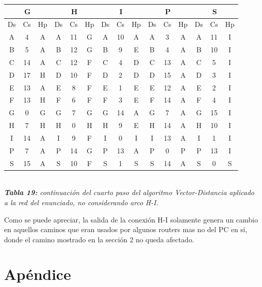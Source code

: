 \documentclass[letterpaper,10pt,onecolumn,titlepage]{article}
\begin{document}
  \begin{center}
   \begin{tabular}{|c|c|c|c|c|c|c|c|c|c|c|c|c|c|c|} \hline
     \multicolumn{3}{|c|}{G} & \multicolumn{3}{|c|}{H} &\multicolumn{3}{|c|}{I} & \multicolumn{3}{|c|}{P} & \multicolumn{3}{|c|}{S}    \\ \hline
     Ds & Cs & Hp & Ds & Cs & Hp & Ds & Cs & Hp & Ds & Cs & Hp & Ds & Cs & Hp  \\ \hline
     A  & 4  & A  & A  & 11  & G  & A  & 10  & A  & A  & 3  & A  & A  & 11  & I   \\ \hline
     B  & 5  & A  & B  & 12  & G  & B  & 9  & E  & B  & 4  & A  & B  & 10  & I   \\ \hline
     C  & 14  & A  & C  & 12  & F  & C  & 4  & D  & C  & 13  & A  & C  & 5  & I \\ \hline
     D  & 17  & H  & D  & 10  & F  & D  & 2  & D  & D  & 15  & A  & D  & 3  & I   \\ \hline
     E  & 13  & A  & E  & 8  & F  & E  & 1  & E  & E  & 12  & A  & E  & 2  & I   \\ \hline
     F  & 13  & H  & F  & 6  & F  & F  & 3  & E  & F  & \color{red}14  & \color{red}A  & F  & 4  & I   \\ \hline
     G  & 0  & G  & G  & 7  & G  & G  & 14  & A  & G  & 7  & A  & G  & 15  & I   \\ \hline
     H  & 7  & H  & H  & 0  & H  & H  & 9  & E  & H  & 14  & A  & H  & \color{red}10  & \color{red}I   \\ \hline
     I  & 14  & A  & I  & 9  & F  & I  & 0  & I  & I  & 13  & A  & I  & 1  & I   \\ \hline
     P  & 7  & A  & P  & 14  & G  & P  & 13  & A  & P  & 0  & P  & P  & 13  & I \\ \hline
     S  & 15  & A  & S  & \color{red}10  & \color{red}F  & S  & 1  & S  & S  & 14  & A  & S  &  0  & S   \\ \hline
   \end{tabular}\\
   \textit{\textbf{Tabla 19:} continuación del cuarto paso del algoritmo Vector-Distancia aplicado a la red del enunciado, no considerando arco H-I.}
 \end{center}

Como se puede apreciar, la salida de la conexión H-I solamente genera un cambio en aquellos caminos que eran usados por algunos routers mas no del PC en si, donde el camino mostrado en la sección 2 no queda afectado.


\section{Apéndice}
 
\end{document}
